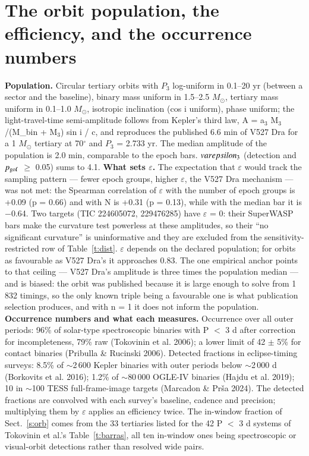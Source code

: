 \documentclass{aa}
\begin{document}
\section{The orbit population, the efficiency, and the occurrence numbers}\label{a:C}
\textbf{Population.} Circular tertiary orbits with $P_3$ log-uniform in 0.1--20 yr (between a sector and the baseline), binary mass uniform in 1.5--2.5 $M_\odot$, tertiary mass uniform in 0.1--1.0 $M_\odot$, isotropic inclination (cos i uniform), phase uniform; the light-travel-time semi-amplitude follows from Kepler's third law, A = a$_3$ M$_3$/(M\_bin + M$_3$) sin i / c, and reproduces the published 6.6 min of V527 Dra for a 1 $M_\odot$ tertiary at 70$^\circ$ and $P_3$ = 2.733 yr. The median amplitude of the population is 2.0 min, comparable to the epoch bars. $\\varepsilon_3$ (detection and $p_{\rm gof}$ $\ge$ 0.05) sums to 4.1.
\textbf{What sets $\varepsilon$.} The expectation that $\varepsilon$ would track the sampling pattern --- fewer epoch groups, higher $\varepsilon$, the V527 Dra mechanism --- was not met: the Spearman correlation of $\varepsilon$ with the number of epoch groups is +0.09 (p = 0.66) and with N is +0.31 (p = 0.13), while with the median bar it is $-$0.64. Two targets (TIC 224605072, 229476285) have $\varepsilon$ = 0: their SuperWASP bars make the curvature test powerless at these amplitudes, so their ``no significant curvature'' is uninformative and they are excluded from the sensitivity-restricted row of Table~\ref{t:dist}. $\varepsilon$ depends on the declared population; for orbits as favourable as V527 Dra's it approaches 0.83. The one empirical anchor points to that ceiling --- V527 Dra's amplitude is three times the population median --- and is biased: the orbit was published because it is large enough to solve from 1\,832 timings, so the only known triple being a favourable one is what publication selection produces, and with n = 1 it does not inform the population.
\textbf{Occurrence numbers and what each measures.} Occurrence over all outer periods: 96\% of solar-type spectroscopic binaries with P $<$ 3 d after correction for incompleteness, 79\% raw (Tokovinin et al. 2006); a lower limit of 42 $\pm$ 5\% for contact binaries (Pribulla \& Rucinski 2006). Detected fractions in eclipse-timing surveys: 8.5\% of $\sim$2\,600 Kepler binaries with outer periods below $\sim$2\,000 d (Borkovits et al. 2016); 1.2\% of $\sim$80\,000 OGLE-IV binaries (Hajdu et al. 2019); 10 in $\sim$100 TESS full-frame-image targets (Marcadon \& Prša 2024). The detected fractions are convolved with each survey's baseline, cadence and precision; multiplying them by $\varepsilon$ applies an efficiency twice. The in-window fraction of Sect.~\ref{s:orb} comes from the 33 tertiaries listed for the 42 P $<$ 3 d systems of Tokovinin et al.'s Table~\ref{t:barras}, all ten in-window ones being spectroscopic or visual-orbit detections rather than resolved wide pairs.
\end{document}
